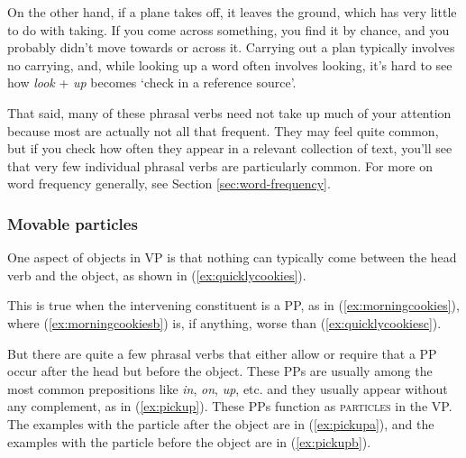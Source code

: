 On the other hand, if a plane takes off, it leaves the ground, which has very
little to do with taking. If you come across something, you find it by chance,
and you probably didn't move towards or across it. Carrying out a plan typically
involves no carrying, and, while looking up a word often involves looking, it's
hard to see how \textit{look} + \textit{up} becomes `check in a reference source'.

That said, many of these phrasal verbs need not take up much of your attention
because most are actually not all that frequent. They may feel quite common, but
if you check how often they appear in a relevant collection of text, you'll see that
very few individual phrasal verbs are particularly common. For more on word
frequency generally, see Section \ref{sec:word-frequency}.

\subsubsection*{Movable particles}

One aspect of objects in VP is that nothing can typically come between the head verb and the object, as shown in (\ref{ex:quicklycookies}).

\ea
    \label{ex:quicklycookiesa}
    \label{ex:quicklycookiesb}
    \label{ex:quicklycookiesc}
    \label{ex:quicklycookiesd}
    \z\label{ex:quicklycookies}
\z

\noindent
This is true when the intervening constituent  is a PP, as in  (\ref{ex:morningcookies}), where (\ref{ex:morningcookiesb}) is, if anything, worse than (\ref{ex:quicklycookiesc}).

\ea
    \label{ex:morningcookiesa}
    \label{ex:morningcookiesb}
    \label{ex:morningcookiesd}
    \z\label{ex:morningcookies}
\z

But there are quite a few phrasal verbs that either allow or require that a PP occur after the head but before the object. These PPs are usually among the most common prepositions like \textit{in}, \textit{on}, \textit{up}, etc. and they usually appear without any complement, as in (\ref{ex:pickup}). These PPs function as \textsc{particles} in the VP. The examples with the particle after the object are in (\ref{ex:pickupa}), and the examples with the particle before the object are in (\ref{ex:pickupb}).

